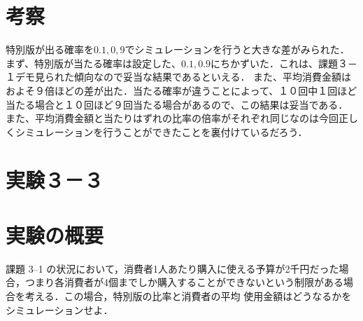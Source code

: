 \documentclass[fleqn, a4paper. 12pt]{ltjsarticle} %
\begin{document}
\section*{考察}
特別版が出る確率を$0.1, 0,9$でシミュレーションを行うと大きな差がみられた．
まず、特別版が当たる確率は設定した、$0.1,0.9$にちかずいた．これは、課題３－１デモ見られた傾向なので妥当な結果であるといえる．
また、平均消費金額はおよそ９倍ほどの差が出た．当たる確率が違うことによって、１０回中１回ほど当たる場合と１０回ほど９回当たる場合があるので、この結果は妥当である．
また、平均消費金額と当たりはずれの比率の倍率がそれぞれ同じなのは今回正しくシミュレーションを行うことができたことを裏付けているだろう．
\newpage
\section*{実験３－３}
\section*{実験の概要}
課題 3–1 の状況において，消費者1人あたり購入に使える予算が2千円だった場合，つまり各消費者が4個までしか購入することができないという制限がある場合を考える．この場合，特別版の比率と消費者の平均
使用金額はどうなるかをシミュレーションせよ．
\end{document}
